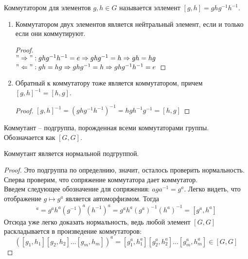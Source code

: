 \begin{conj}
    Коммутатором для элементов $g, h \in G$ называется эллемент $[g, h] = ghg^{-1}h^{-1}$.
\end{conj}
\begin{notice}
    \begin{enumerate}
        \item Коммутатором двух элементов является нейтральный элемент, если и только если они коммутируют.
        \begin{proof} \quad \\
            $"\Rightarrow": ghg^{-1}h^{-1} = e \Rightarrow ghg^{-1} = h \Rightarrow gh = hg$ \\
            $"\Leftarrow": gh = hg \Rightarrow ghg^{-1} = h \Rightarrow ghg^{-1}h^{-1} = e$
        \end{proof}
        \item Обратный к коммутатору тоже является коммутатором, причем $[g, h]^{-1} = [h, g]$.
        \begin{proof}
            $[g, h]^{-1} = (ghg^{-1}h^{-1})^{-1} = hgh^{-1}g^{-1} = [h, g]$
        \end{proof}
    \end{enumerate}
    
\end{notice}


\begin{conj}
    Коммутант -- подгруппа, порожденная всеми коммутаторами группы. Обозначается как $[G, G]$.
\end{conj}

\begin{theorem}
    Коммутант является нормальной подгруппой.
\end{theorem}
\begin{proof}
    Это подгруппа по определнию, значит, осталось проверить нормальность.
    Сперва проверим, что сопряжение коммутатора дает коммутатор. \\
    Введем следующее обозначение для сопряжения: $aga^{-1} = g^a$.
    Легко видеть, что отображение $g \mapsto g^a$ является автоморфизмом.
    Тогда
    \begin{gather*}
        [g, h]^a = g^ah^a(g^{-1})^a(h^{-1})^a = g^ah^a(g^a)^{-1}(h^a)^{-1} = [g^a, h^a]
    \end{gather*}
    Отсюда уже легко доказать нормальность, ведь любой элемент $[G, G]$ раскладывается в произведение коммутаторов:
    \[ ([g_1, h_1][g_2, h_2]\dots[g_m, h_m])^a = [g_1^a, h_1^a][g_2^a, h_2^a]\dots[g_m^a, h_m^a] \in [G, G] \]
\end{proof}

